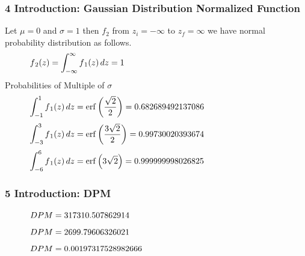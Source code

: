 \documentclass[11pt]{beamer}
\begin{document}
\begin{frame}
\frametitle{4 Introduction: Gaussian Distribution Normalized Function}
\noindent Let $\mu = 0 $ and $\sigma = 1 $ then  $f_{2} $ from $z_{i} = -\infty $ to $z_{f} = \infty $ we have normal probability    distribution as follows.
\begin{equation}
\begin{minipage}{300pt}
 $\displaystyle f{_2}(z) = \int_{-\infty}^{\infty} f{_1}(z)\, dz = 1$  
\end{minipage}
\end{equation}
\noindent Probabilities of Multiple of $\sigma$ 
\begin{equation}
\begin{minipage}{300pt}
 $\displaystyle \int_{-1}^{1} f{_1}(z)\, dz = \operatorname{erf}{\left (\frac{\sqrt{2}}{2} \right )} = 0.682689492137086$  
\end{minipage}
\end{equation}
\begin{equation}
\begin{minipage}{300pt}
 $\displaystyle \int_{-3}^{3} f{_1}(z)\, dz = \operatorname{erf}{\left (\frac{3 \sqrt{2}}{2} \right )} = 0.99730020393674$  
\end{minipage}
\end{equation}
\begin{equation}
\begin{minipage}{300pt}
 $\displaystyle \int_{-6}^{6} f{_1}(z)\, dz = \operatorname{erf}{\left (3 \sqrt{2} \right )} = 0.999999998026825$  
\end{minipage}
\end{equation}

\end{frame}

\begin{frame}
\frametitle{5 Introduction: DPM}
\begin{equation}
\begin{minipage}{300pt}
 $\displaystyle DPM = 317310.507862914$  
\end{minipage}
\end{equation}
\begin{equation}
\begin{minipage}{300pt}
 $\displaystyle DPM = 2699.79606326021$  
\end{minipage}
\end{equation}
\begin{equation}
\begin{minipage}{300pt}
 $\displaystyle DPM = 0.00197317528982666$  
\end{minipage}
\end{equation}

\end{frame}
\end{document}
